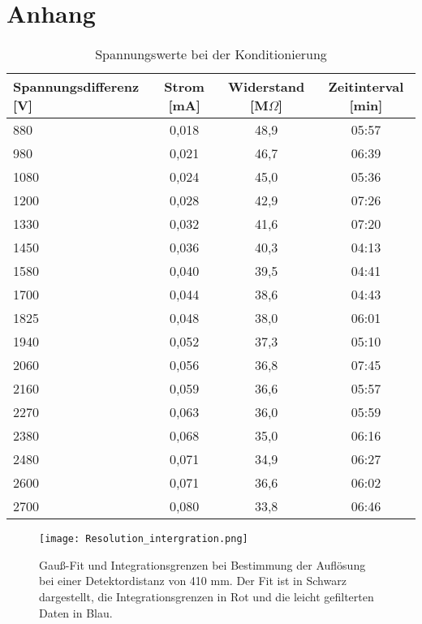 \appendix
\chapter[]{Anhang}
\begin{table}[H]
    \caption{Spannungswerte bei der Konditionierung}
    \label{tab:Konditionierung}
    \begin{tabular}{lccc}
        \toprule
        Spannungsdifferenz [V] & Strom [mA] &	Widerstand [M$\Omega$] & Zeitinterval [min]\\   
        \midrule
            880  & 0,018 & 48,9 & 05:57\\
            980  & 0,021 & 46,7 & 06:39\\
            1080 & 0,024 & 45,0 & 05:36\\
            1200 & 0,028 & 42,9 & 07:26\\
            1330 & 0,032 & 41,6 & 07:20\\
            1450 & 0,036 & 40,3 & 04:13\\
            1580 & 0,040 & 39,5 & 04:41\\
            1700 & 0,044 & 38,6 & 04:43\\
            1825 & 0,048 & 38,0 & 06:01\\
            1940 & 0,052 & 37,3 & 05:10\\
            2060 & 0,056 & 36,8 & 07:45\\
            2160 & 0,059 & 36,6 & 05:57\\
            2270 & 0,063 & 36,0 & 05:59\\
            2380 & 0,068 & 35,0 & 06:16\\
            2480 & 0,071 & 34,9 & 06:27\\
            2600 & 0,071 & 36,6 & 06:02\\
            2700 & 0,080 & 33,8 & 06:46\\   
        \bottomrule     
    \end{tabular}
\end{table}


\begin{figure}[H]
    \centering
    \hspace{-1.5cm}\texttt{[image: Resolution\_intergration.png]}
    \caption[Gauß-Fit und Integrationsgrenzen bei Bestimmung der Auflösung]{Gauß-Fit und Integrationsgrenzen bei Bestimmung der Auflösung bei einer Detektordistanz von 410 mm. Der Fit ist in Schwarz dargestellt, die Integrationsgrenzen in Rot und die leicht gefilterten Daten in Blau.}
    \label{fig:integrationsgrenzen}
\end{figure}
\clearpage
